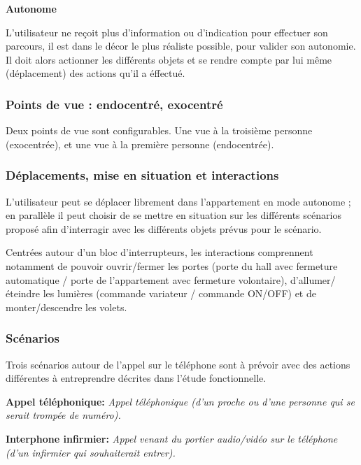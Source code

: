\textbf{Autonome}
\newline 

L’utilisateur ne reçoit plus d’information ou d’indication pour effectuer son parcours, il est dans le décor le plus réaliste possible, pour valider son autonomie. Il doit alors actionner les différents objets et se rendre compte par lui même (déplacement) des actions qu'il a éffectué.

\subsubsection{Points de vue : endocentré, exocentré}

Deux points de vue sont configurables. Une vue à la troisième personne (exocentrée), et une vue à la première personne (endocentrée).

\subsubsection{Déplacements, mise en situation et interactions}

L'utilisateur peut se déplacer librement dans l'appartement en mode autonome ; en parallèle il peut choisir de se mettre en situation sur les différents scénarios proposé afin d'interragir avec les différents objets prévus pour le scénario. 

Centrées autour d’un bloc d’interrupteurs, les interactions comprennent notamment de pouvoir ouvrir/fermer les portes (porte du hall avec fermeture automatique / porte de l’appartement avec fermeture volontaire), d'allumer/éteindre les lumières (commande variateur / commande ON/OFF) et de monter/descendre les volets.

\subsubsection{Scénarios}
Trois scénarios autour de l'appel sur le téléphone sont à prévoir avec des actions différentes à entreprendre décrites dans l'étude fonctionnelle. 
\newline 

\textbf{Appel téléphonique: }\textit{Appel téléphonique (d’un proche ou d’une personne qui se serait trompée de numéro). }\newline 

\textbf{Interphone infirmier: } \textit{Appel venant du portier audio/vidéo sur le téléphone (d’un infirmier qui souhaiterait entrer). }\newline 

